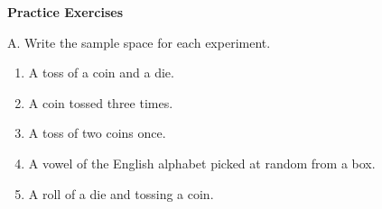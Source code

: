 \textbf{Practice Exercises}

\vspce

A. Write the sample space for each experiment.
\begin{enumerate}[label = \arabic*. ]
\item A toss of a coin and a die. 
\item A coin tossed three times. 
\item A toss of two coins once. 
\item A vowel of the English alphabet picked at random from a box. 
\item A roll of a die and tossing a coin. 
\end{enumerate} 


